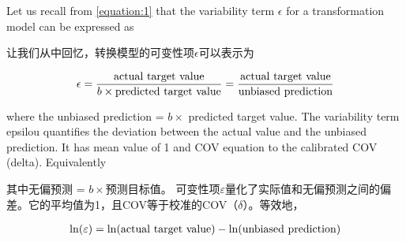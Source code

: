 \begin{paracol}{2}

    Let us recall from \autoref{equation:1} that the variability term $\epsilon$ for a  transformation model can be expressed as

    \switchcolumn

    让我们从中回忆，转换模型的可变性项$\epsilon$可以表示为
\end{paracol}

\begin{align}
    \epsilon=\dfrac{\rm{actual~target~value}}{b\times{}\rm{predicted~target~value}}=\dfrac{\rm{actual~target~value}}{\rm{unbiased~prediction}}
    \label{equation:2}
\end{align}

\begin{paracol}{2}

    where the unbiased prediction = $b\times$ predicted target value. The variability term epsilou quantifies the deviation between the actual value and the unbiased prediction. It has mean value of 1 and COV equation to the calibrated COV (delta). Equivalently

    \switchcolumn

    其中无偏预测 = $b\times$预测目标值。 可变性项$\varepsilon$量化了实际值和无偏预测之间的偏差。它的平均值为1，且COV等于校准的COV（$\delta$）。等效地，
\end{paracol}

\begin{align}
    \ln(\varepsilon)=\ln(\rm{actual~target~value})-\ln({\rm{unbiased~prediction}})
    \label{equation:3}
\end{align}

